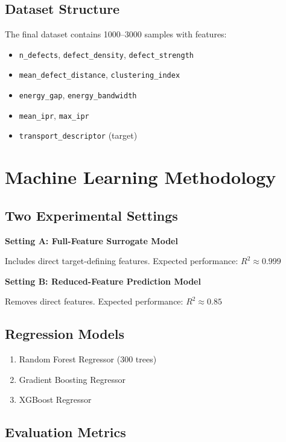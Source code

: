 \documentclass[11pt,a4paper]{article}
\begin{document}
\subsection{Dataset Structure}

The final dataset contains 1000--3000 samples with features:

\begin{itemize}
    \item \texttt{n\_defects}, \texttt{defect\_density}, \texttt{defect\_strength}
    \item \texttt{mean\_defect\_distance}, \texttt{clustering\_index}
    \item \texttt{energy\_gap}, \texttt{energy\_bandwidth}
    \item \texttt{mean\_ipr}, \texttt{max\_ipr}
    \item \texttt{transport\_descriptor} (target)
\end{itemize}

\newpage
\section{Machine Learning Methodology}

\subsection{Two Experimental Settings}

\textbf{Setting A: Full-Feature Surrogate Model}

Includes direct target-defining features. Expected performance: $R^2 \approx 0.999$

\textbf{Setting B: Reduced-Feature Prediction Model}

Removes direct features. Expected performance: $R^2 \approx 0.85$

\subsection{Regression Models}

\begin{enumerate}
    \item Random Forest Regressor (300 trees)
    \item Gradient Boosting Regressor
    \item XGBoost Regressor
\end{enumerate}

\subsection{Evaluation Metrics}
\end{document}
